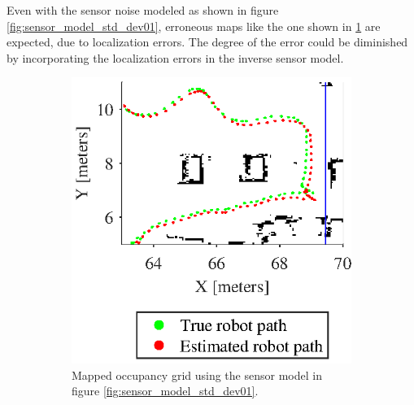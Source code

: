 Even with the sensor noise modeled as shown in figure \ref{fig:sensor_model_std_dev01}, erroneous maps like the one shown in \ref{fig:elfes_ideal_with_poses} are expected, due to localization errors. The degree of the error could be diminished by incorporating the localization errors in the inverse sensor model. 

\begin{figure}
	\centering
	\begin{subfigure}[b]{0.45\textwidth}
		\includegraphics[scale=1.0]{figures/static_mapping/elfes_ideal_with_poses_no_decay}
		\caption{Mapped occupancy grid using the sensor model in figure \ref{fig:sensor_model_std_dev01}.}
		\label{fig:elfes_ideal_with_poses}
		\end{subfigure}
		~ %
		\begin{subfigure}[b]{0.45\textwidth}

\end{subfigure}
\end{figure}

